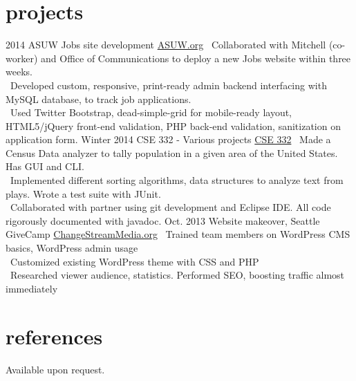 \documentclass[]{friggeri-cv}
\begin{document}
\section{projects}

\begin{entrylist}
  \entry
    {2014}
    {ASUW Jobs site development}
    {\href{http://jobs.asuw.org}{ASUW.org}}
    {\bullet \, Collaborated with Mitchell (co-worker) and Office of Communications to deploy a new Jobs website within three weeks. \\
    \bullet \, Developed custom, responsive, print-ready admin backend interfacing with MySQL database, to track job applications. \\
    \bullet \, Used Twitter Bootstrap, dead-simple-grid for mobile-ready layout, HTML5/jQuery front-end validation, PHP back-end validation, sanitization on application form.
    }
  \entry
    {Winter 2014}
    {CSE 332 - Various projects}
    {\href{http://cs.washington.edu/332}{CSE 332}}
    {\bullet \, Made a Census Data analyzer to tally population in a given area of the United States. Has GUI and CLI. \\
    \bullet \, Implemented different sorting algorithms, data structures to analyze text from plays. Wrote a test suite with JUnit. \\
    \bullet \, Collaborated with partner using git development and Eclipse IDE. All code rigorously documented with javadoc.}
  \entry
    {Oct. 2013}
    {Website makeover, Seattle GiveCamp}
    {\href{http://changestreammedia.org}{ChangeStreamMedia.org}}
    {\bullet \, Trained team members on WordPress CMS basics, WordPress admin usage \\
    \bullet \, Customized existing WordPress theme with CSS and PHP \\
    \bullet \, Researched viewer audience, statistics. Performed SEO, boosting traffic almost immediately}
\end{entrylist}

\section{references}

Available upon request.
\end{document}
